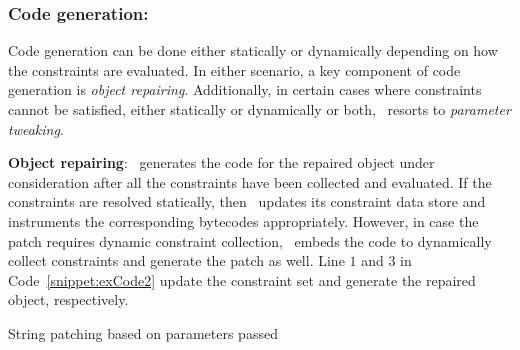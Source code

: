 \subsubsection{Code generation: }
\label{sec:tool:stage2:generation}

Code generation can be done either statically or dynamically depending on how
the constraints are evaluated. In either scenario, a key component of code
generation is \textit{object repairing}. Additionally, in certain cases
where constraints cannot be satisfied, either statically or dynamically or
both, \tool\ resorts to \textit{parameter tweaking}.

\begin{mylist}

 \item \textbf{Object repairing}: \tool\ generates the code for the repaired
object under consideration after all the constraints have been collected and
evaluated. If the constraints are resolved statically, then \tool\ updates its
constraint data store and instruments the corresponding bytecodes appropriately.
However, in case the patch requires dynamic constraint collection, \tool\ embeds
the code to dynamically collect constraints and generate the patch as well. Line
$1$ and $3$ in Code~\ref{snippet:exCode2} update the constraint set and generate
the repaired object, respectively.

\begin{algorithm}[t]
\scriptsize
\DontPrintSemicolon
{}
\caption{String patching based on parameters passed}
\label{algo:stringPatchParametr}
\end{algorithm}


\end{mylist}
